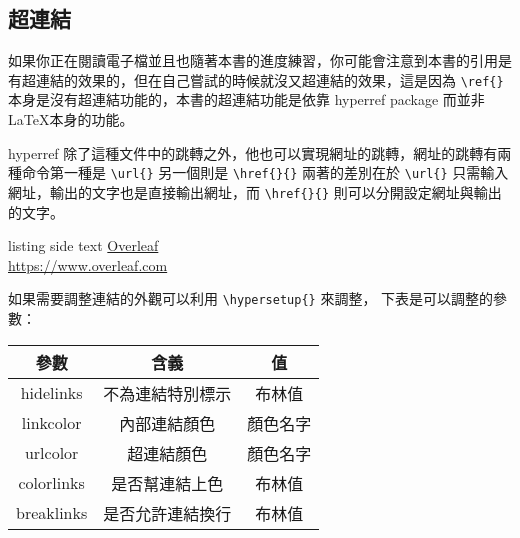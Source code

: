 \subsection{超連結}

如果你正在閱讀電子檔並且也隨著本書的進度練習，你可能會注意到本書的引用是有超連結的效果的，但在自己嘗試的時候就沒又超連結的效果，這是因為 \verb|\ref{}| 本身是沒有超連結功能的，本書的超連結功能是依靠 hyperref package 而並非 \LaTeX 本身的功能。

hyperref 除了這種文件中的跳轉之外，他也可以實現網址的跳轉，網址的跳轉有兩種命令第一種是 \verb|\url{}| 另一個則是 \verb|\href{}{}| 兩著的差別在於 \verb|\url{}| 只需輸入網址，輸出的文字也是直接輸出網址，而 \verb|\href{}{}| 則可以分開設定網址與輸出的文字。

\begin{tcblisting}{listing side text}
\href{https://www.overleaf.com}{Overleaf}\\
\url{https://www.overleaf.com}
\end{tcblisting}

如果需要調整連結的外觀可以利用 \verb|\hypersetup{}| 來調整， 下表是可以調整的參數：

\begin{tabular}{ccc}
\hline
參數 & 含義 & 值 \\\hline\hline
hidelinks & 不為連結特別標示 & 布林值 \\\hline
linkcolor & 內部連結顏色 & 顏色名字 \\\hline
urlcolor & 超連結顏色 & 顏色名字 \\\hline
colorlinks & 是否幫連結上色 & 布林值 \\\hline
breaklinks & 是否允許連結換行 & 布林值 \\\hline
\end{tabular}
